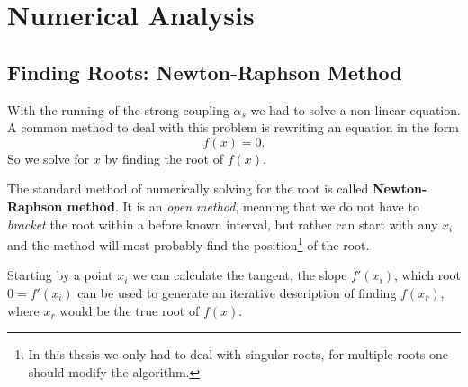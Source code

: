 		
	
		

		
		
\section{Numerical Analysis}
\cite{Chapra2010} \cite{Press2007}
\subsection{Finding Roots: Newton-Raphson Method}
With the running of the strong coupling $\alpha_s$ we had to solve a non-linear equation. A common method to deal with this problem is rewriting an equation in the form
\begin{equation}
	f(x) = 0.
\end{equation}
So we solve for $x$ by finding the root of $f(x)$. 

The standard method of numerically solving for the root is called \textbf{Newton-Raphson method}. It is an \textit{open method}, meaning that we do not have to \textit{bracket} the root within a before known interval, but rather can start with any $x_i$ and the method will most probably find the position\footnote{In this thesis we only had to deal with singular roots, for multiple roots one should modify the algorithm.} of the root.

Starting by a point $x_i$ we can calculate the tangent, the slope $f'(x_i)$, which root $0 = f'(x_i)$ can be used to generate an iterative description of finding $f(x_r)$, where $x_r$ would be the true root of $f(x)$. 

